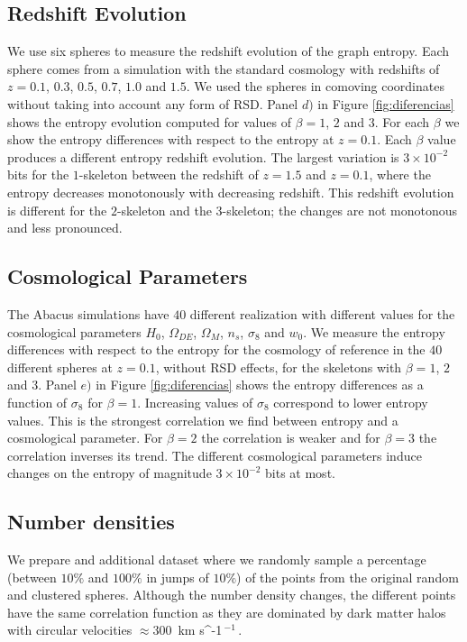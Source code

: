 \documentclass[fleqn,usenatbib]{mnras}
\newcommand{\kms}{\,{\rm km s}\ifmmode ^{-1}\,\else $^{-1}$\,\fi}
\begin{document}
\subsection{Redshift Evolution}
We use six spheres to measure the redshift evolution of the graph entropy. 
Each sphere comes from a simulation with the standard cosmology with redshifts of
$z=0.1$, $0.3$, $0.5$, $0.7$, $1.0$ and $1.5$. 
We used the spheres in comoving coordinates without taking into account any form of RSD.
Panel $d)$ in Figure \ref{fig:diferencias} shows the entropy evolution computed for values
of $\beta=1$, $2$ and $3$.
For each $\beta$ we show the entropy differences with respect to the entropy at $z=0.1$.
Each $\beta$ value produces a different entropy redshift evolution.
The largest variation is $3\times 10^{-2}$ bits for the $1$-skeleton between the redshift of
$z=1.5$ and $z=0.1$, where the entropy decreases monotonously with decreasing redshift.
This redshift evolution is different for the $2$-skeleton and the $3$-skeleton; the changes 
are not monotonous and less pronounced.

\subsection{Cosmological Parameters}
The Abacus simulations have $40$ different realization with different values for the
cosmological  parameters $H_0$, $\Omega_{DE}$, $\Omega_{M}$, $n_s$, $\sigma_8$ and $w_0$.
We measure the entropy differences with respect to the entropy for the cosmology of 
reference in the $40$ different spheres at $z=0.1$, without RSD effects, 
for the skeletons with $\beta=1$, $2$ and $3$.
Panel $e)$ in Figure \ref{fig:diferencias} 
shows the entropy differences as a function of $\sigma_8$ for $\beta=1$.
Increasing values of $\sigma_8$ correspond to lower entropy values. 
This is the strongest correlation we find between entropy and a cosmological parameter.
For $\beta=2$ the correlation is weaker and for $\beta=3$ the correlation inverses its
trend.
The different cosmological parameters induce changes on the entropy of magnitude $3\times10^{-2}$ bits at most.

\subsection{Number densities}

We prepare and additional dataset where we randomly 
sample a percentage (between $10\%$ and $100\%$ in jumps of $10\%$) 
of the points from the original random and clustered spheres.
Although the number density changes, the different points have the 
same correlation function as they are dominated by dark matter halos with circular velocities $\approx 300$ \kms.
\end{document}
